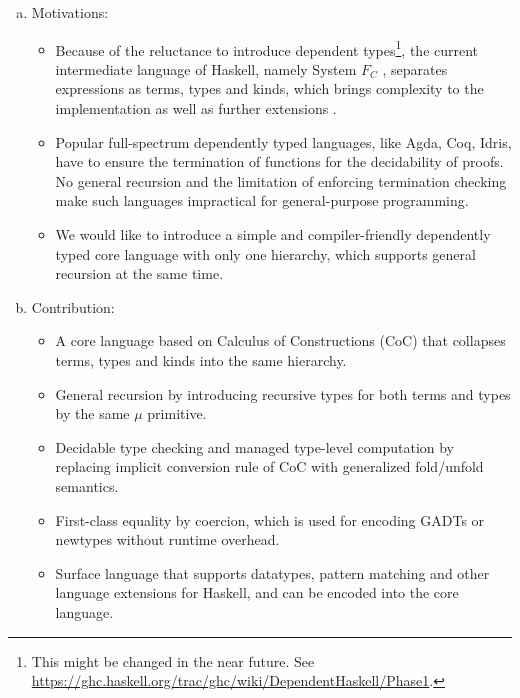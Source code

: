 \begin{enumerate}[a)]
\item Motivations:

\begin{itemize}

\item Because of the reluctance to introduce dependent
  types\footnote{This might be changed in the near future. See
    \url{https://ghc.haskell.org/trac/ghc/wiki/DependentHaskell/Phase1}.},
  the current intermediate language of Haskell, namely System $F_C$
  \cite{fc}, separates expressions as terms, types and kinds, which
  brings complexity to the implementation as well as further
  extensions \cite{fc:pro,fc:kind}.

\item Popular full-spectrum dependently typed languages, like Agda,
  Coq, Idris, have to ensure the termination of functions for the
  decidability of proofs. No general recursion and the limitation of
  enforcing termination checking make such languages impractical for
  general-purpose programming.

\item We would like to introduce a simple and compiler-friendly
  dependently typed core language with only one hierarchy, which
  supports general recursion at the same time.

\end{itemize}

\item Contribution:

\begin{itemize}

\item A core language based on Calculus of Constructions (CoC) that
  collapses terms, types and kinds into the same hierarchy.

\item General recursion by introducing recursive types for both terms
  and types by the same $\mu$ primitive.

\item Decidable type checking and managed type-level computation by
  replacing implicit conversion rule of CoC with generalized
  \textsf{fold}/\textsf{unfold} semantics.

\item First-class equality by coercion, which is used for encoding
  GADTs or newtypes without runtime overhead.

\item Surface language that supports datatypes, pattern matching and
  other language extensions for Haskell, and can be encoded into the
  core language.


\end{itemize}
\end{enumerate}
